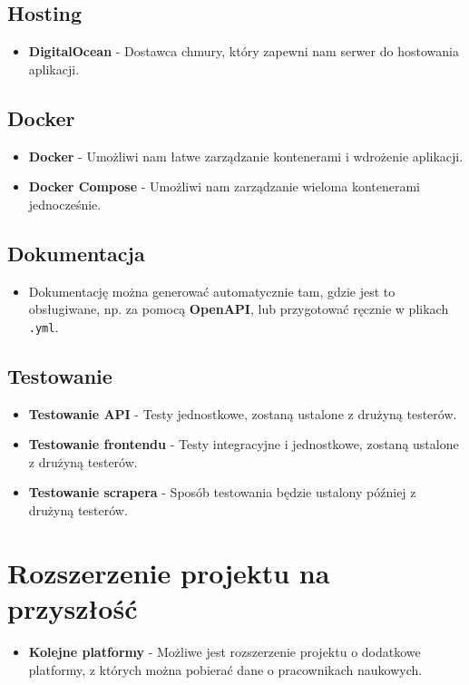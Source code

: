 \documentclass{article}
\begin{document}
\subsection{Hosting}
\begin{itemize}
  \item \textbf{DigitalOcean} - Dostawca chmury, który zapewni nam serwer do hostowania aplikacji.
\end{itemize}

\subsection{Docker}
\begin{itemize}
  \item \textbf{Docker} - Umożliwi nam łatwe zarządzanie kontenerami i wdrożenie aplikacji.
  \item \textbf{Docker Compose} - Umożliwi nam zarządzanie wieloma kontenerami jednocześnie.
\end{itemize}

\subsection{Dokumentacja}
\begin{itemize}
  \item Dokumentację można generować automatycznie tam, gdzie jest to obsługiwane, np. za pomocą \textbf{OpenAPI}, lub przygotować ręcznie w plikach \texttt{.yml}.
\end{itemize}

\subsection{Testowanie}
\begin{itemize}
  \item \textbf{Testowanie API} - Testy jednostkowe, zostaną ustalone z drużyną testerów.
  \item \textbf{Testowanie frontendu} - Testy integracyjne i jednostkowe, zostaną ustalone z drużyną testerów.
  \item \textbf{Testowanie scrapera} - Sposób testowania będzie ustalony później z drużyną testerów.
\end{itemize}
\newpage
\section{Rozszerzenie projektu na przyszłość}
\begin{itemize}
  \item \textbf{Kolejne platformy} - Możliwe jest rozszerzenie projektu o dodatkowe platformy, z których można pobierać dane o pracownikach naukowych.
\end{itemize}
\end{document}
